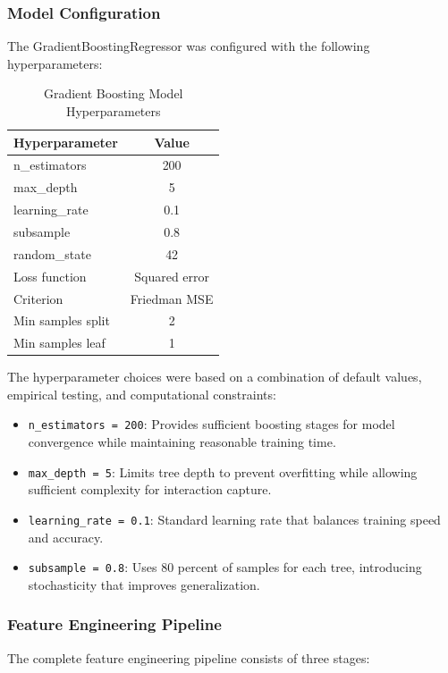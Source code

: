 \subsubsection{Model Configuration}

The GradientBoostingRegressor was configured with the following hyperparameters:

\begin{table}[H]
\centering
\caption{Gradient Boosting Model Hyperparameters}
\label{tab:hyperparameters}
\begin{tabular}{lc}
\toprule
\textbf{Hyperparameter} & \textbf{Value} \\
\midrule
n\_estimators & 200 \\
max\_depth & 5 \\
learning\_rate & 0.1 \\
subsample & 0.8 \\
random\_state & 42 \\
Loss function & Squared error \\
Criterion & Friedman MSE \\
Min samples split & 2 \\
Min samples leaf & 1 \\
\bottomrule
\end{tabular}
\end{table}

The hyperparameter choices were based on a combination of default values, empirical testing, and computational constraints:
\begin{itemize}
  \item \texttt{n\_estimators = 200}: Provides sufficient boosting stages for model convergence while maintaining reasonable training time.
  \item \texttt{max\_depth = 5}: Limits tree depth to prevent overfitting while allowing sufficient complexity for interaction capture.
  \item \texttt{learning\_rate = 0.1}: Standard learning rate that balances training speed and accuracy.
  \item \texttt{subsample = 0.8}: Uses 80 percent of samples for each tree, introducing stochasticity that improves generalization.
\end{itemize}

\subsubsection{Feature Engineering Pipeline}

The complete feature engineering pipeline consists of three stages:

